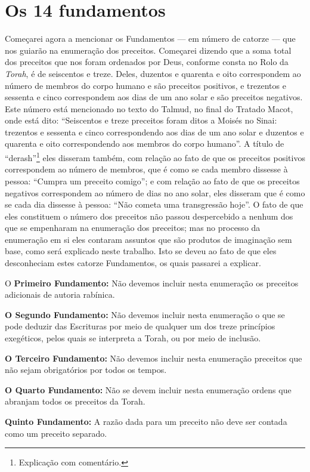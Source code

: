 \chapter{Os 14 fundamentos} 

Começarei agora a mencionar os Fundamentos --- em número de catorze ---
que nos guiarão na enumeração dos preceitos. Começarei dizendo que a
soma total dos preceitos que nos foram ordenados por Deus, conforme
consta no Rolo da \emph{Torah}, é de seiscentos e treze. Deles,
duzentos e quarenta e oito correspondem ao número de membros do corpo
humano e são preceitos positivos, e trezentos e sessenta e cinco
correspondem aos dias de um ano solar e são preceitos negativos. Este
número está mencionado no texto do Talmud, no final do Tratado Macot,
onde está dito: ``Seiscentos e treze preceitos foram ditos a Moisés no
Sinai: trezentos e sessenta e cinco correspondendo aos dias de um ano
solar e duzentos e quarenta e oito correspondendo aos membros do corpo
humano''. A título de ``derash''\footnote{Explicação com comentário.} eles disseram
também, com relação ao fato de que os preceitos positivos correspondem
ao número de membros, que é como se cada membro dissesse à pessoa:
``Cumpra um preceito comigo''; e com relação ao fato de que os
preceitos negativos correspondem ao número de dias no ano solar, eles
disseram que é como se cada dia dissesse à pessoa: ``Não cometa uma
transgressão hoje''. O fato de que eles constituem o número dos
preceitos não passou despercebido a nenhum dos que se empenharam na
enumeração dos preceitos; mas no processo da enumeração em si eles
contaram assuntos que são produtos de imaginação sem base, como será
explicado neste trabalho. Isto se deveu ao fato de que eles
desconheciam estes catorze Fundamentos, os quais passarei a explicar.

O \textbf{Primeiro Fundamento:} Não devemos incluir nesta enumeração os
preceitos adicionais de autoria rabínica.

\textbf{O Segundo Fundamento:} Não devemos incluir nesta enumeração o
que se pode deduzir das Escrituras por meio de qualquer um dos treze
princípios exegéticos, pelos quais se interpreta a Torah, ou por meio
de inclusão.

\textbf{O Terceiro Fundamento:} Não devemos incluir nesta enumeração
preceitos que não sejam obrigatórios por todos os tempos.

\textbf{O Quarto Fundamento:} Não se devem incluir nesta enumeração
ordens que abranjam todos os preceitos da Torah.


\textbf{Quinto Fundamento:} A razão dada para um preceito não deve ser
contada como um preceito separado.



